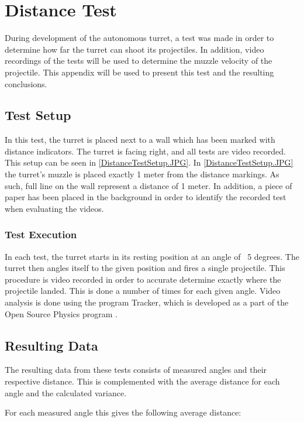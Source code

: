 \chapter{Distance Test}\label{AppendixDistTest}
During development of the autonomous turret, a test was made in order to
determine how far the turret can shoot its projectiles. In addition, video
recordings of the tests will be used to determine the muzzle velocity of the
projectile. This appendix will be used to present this test and the resulting
conclusions.

\section{Test Setup}
In this test, the turret is placed next to a wall which has been marked with
distance indicators. The turret is facing right, and all tests are video
recorded. This setup can be seen in \autoref{DistanceTestSetup.JPG}.
 In \autoref{DistanceTestSetup.JPG} the turret's muzzle is placed exactly 1 meter
from the distance markings. As such, full line on the wall represent a
distance of 1 meter. In addition, a piece of paper has been placed in the
background in order to identify the recorded test when evaluating the videos. 

\subsection{Test Execution}
In each test, the turret starts in its resting position at an angle of ~5
degrees. The turret then angles itself to the given position and fires a single
projectile. This procedure is video recorded in order to accurate determine
exactly where the projectile landed. This is done a number of times for each
given angle. Video analysis is done using the program Tracker, which is
developed as a part of the Open Source Physics program \cite{Tracker}.

\section{Resulting Data}
The resulting data from these tests consists of measured angles and their
respective distance. This is complemented with the average distance for each
angle and the calculated variance.

For each measured angle this gives the following average distance:

